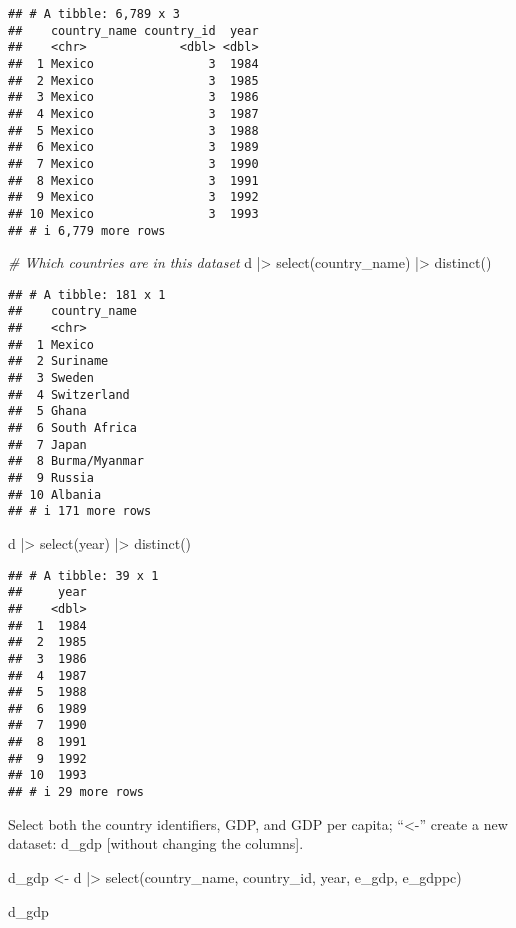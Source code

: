 \documentclass[
]{article}
\newenvironment{Shaded}{\begin{snugshade}}{\end{snugshade}}
\newcommand{\CommentTok}[1]{\textcolor[rgb]{0.56,0.35,0.01}{\textit{#1}}}
\newcommand{\FunctionTok}[1]{\textcolor[rgb]{0.00,0.00,0.00}{#1}}
\newcommand{\NormalTok}[1]{#1}
\newcommand{\OtherTok}[1]{\textcolor[rgb]{0.56,0.35,0.01}{#1}}
\newcommand{\SpecialCharTok}[1]{\textcolor[rgb]{0.00,0.00,0.00}{#1}}
\begin{document}
\begin{verbatim}
## # A tibble: 6,789 x 3
##    country_name country_id  year
##    <chr>             <dbl> <dbl>
##  1 Mexico                3  1984
##  2 Mexico                3  1985
##  3 Mexico                3  1986
##  4 Mexico                3  1987
##  5 Mexico                3  1988
##  6 Mexico                3  1989
##  7 Mexico                3  1990
##  8 Mexico                3  1991
##  9 Mexico                3  1992
## 10 Mexico                3  1993
## # i 6,779 more rows
\end{verbatim}

\begin{Shaded}
\begin{Highlighting}[]
\CommentTok{\# Which countries are in this dataset}
\NormalTok{d }\SpecialCharTok{|\textgreater{}} \FunctionTok{select}\NormalTok{(country\_name) }\SpecialCharTok{|\textgreater{}} \FunctionTok{distinct}\NormalTok{()}
\end{Highlighting}
\end{Shaded}

\begin{verbatim}
## # A tibble: 181 x 1
##    country_name 
##    <chr>        
##  1 Mexico       
##  2 Suriname     
##  3 Sweden       
##  4 Switzerland  
##  5 Ghana        
##  6 South Africa 
##  7 Japan        
##  8 Burma/Myanmar
##  9 Russia       
## 10 Albania      
## # i 171 more rows
\end{verbatim}

\begin{Shaded}
\begin{Highlighting}[]
\NormalTok{d }\SpecialCharTok{|\textgreater{}} \FunctionTok{select}\NormalTok{(year) }\SpecialCharTok{|\textgreater{}} \FunctionTok{distinct}\NormalTok{()}
\end{Highlighting}
\end{Shaded}

\begin{verbatim}
## # A tibble: 39 x 1
##     year
##    <dbl>
##  1  1984
##  2  1985
##  3  1986
##  4  1987
##  5  1988
##  6  1989
##  7  1990
##  8  1991
##  9  1992
## 10  1993
## # i 29 more rows
\end{verbatim}

Select both the country identifiers, GDP, and GDP per capita;
``\textless-'' create a new dataset: d\_gdp {[}without changing the
columns{]}.

\begin{Shaded}
\begin{Highlighting}[]
\NormalTok{d\_gdp }\OtherTok{\textless{}{-}}\NormalTok{ d }\SpecialCharTok{|\textgreater{}} 
  \FunctionTok{select}\NormalTok{(country\_name, country\_id, year, e\_gdp, e\_gdppc)}

\NormalTok{d\_gdp}
\end{Highlighting}
\end{Shaded}
\end{document}
